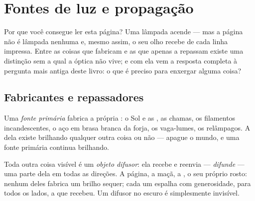 \chapter{Fontes de luz e propagação}\label{ch:g7:light-sources-propagation}

Por que você consegue ler esta página? Uma lâmpada acende --- mas a
página não é lâmpada nenhuma e, mesmo assim, o seu olho recebe  de
cada linha impressa. Entre as coisas que fabricam  e as que apenas
a repassam existe uma distinção sem a qual a óptica não vive; e com
ela vem a resposta completa à pergunta mais antiga deste livro: o que
é preciso para enxergar alguma coisa?

\section{Fabricantes e repassadores}

\begin{definition}\label{def:g7:light-sources-propagation:primary}
Uma \emph{fonte primária} fabrica a própria
: o Sol e as , as chamas, os filamentos incandescentes, o
aço em brasa branca da forja, os vaga-lumes, os relâmpagos. A 
dela existe brilhando qualquer outra coisa ou não --- apague o mundo,
e uma fonte primária continua brilhando.
\end{definition}

\begin{definition}\label{def:g7:light-sources-propagation:diffusion}
Toda outra coisa visível é um \emph{objeto
difusor}: ela recebe  e reenvia --- \emph{difunde}
--- uma parte dela em todas as direções. A página, a maçã, a , o
seu próprio rosto: nenhum deles fabrica um brilho sequer; cada um
espalha com generosidade, para todos os lados, a  que recebeu. Um
difusor no escuro é simplesmente invisível.
\end{definition}

